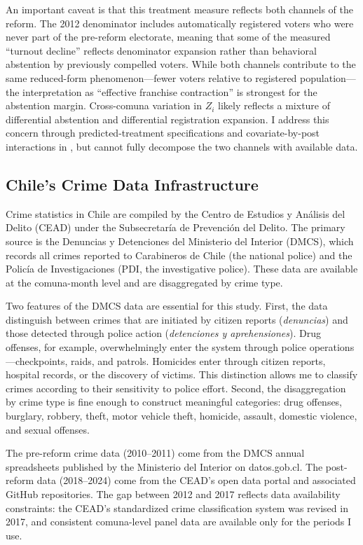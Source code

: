 \documentclass[12pt]{article}
\begin{document}
An important caveat is that this treatment measure reflects both channels of the reform. The 2012 denominator includes automatically registered voters who were never part of the pre-reform electorate, meaning that some of the measured ``turnout decline'' reflects denominator expansion rather than behavioral abstention by previously compelled voters. While both channels contribute to the same reduced-form phenomenon---fewer voters relative to registered population---the interpretation as ``effective franchise contraction'' is strongest for the abstention margin. Cross-comuna variation in $Z_i$ likely reflects a mixture of differential abstention and differential registration expansion. I address this concern through predicted-treatment specifications and covariate-by-post interactions in , but cannot fully decompose the two channels with available data.

\subsection{Chile's Crime Data Infrastructure}

Crime statistics in Chile are compiled by the Centro de Estudios y An\'{a}lisis del Delito (CEAD) under the Subsecretar\'{i}a de Prevenci\'{o}n del Delito. The primary source is the Denuncias y Detenciones del Ministerio del Interior (DMCS), which records all crimes reported to Carabineros de Chile (the national police) and the Polic\'{i}a de Investigaciones (PDI, the investigative police). These data are available at the comuna-month level and are disaggregated by crime type.

Two features of the DMCS data are essential for this study. First, the data distinguish between crimes that are initiated by citizen reports (\textit{denuncias}) and those detected through police action (\textit{detenciones y aprehensiones}). Drug offenses, for example, overwhelmingly enter the system through police operations---checkpoints, raids, and patrols. Homicides enter through citizen reports, hospital records, or the discovery of victims. This distinction allows me to classify crimes according to their sensitivity to police effort. Second, the disaggregation by crime type is fine enough to construct meaningful categories: drug offenses, burglary, robbery, theft, motor vehicle theft, homicide, assault, domestic violence, and sexual offenses.

The pre-reform crime data (2010--2011) come from the DMCS annual spreadsheets published by the Ministerio del Interior on datos.gob.cl. The post-reform data (2018--2024) come from the CEAD's open data portal and associated GitHub repositories. The gap between 2012 and 2017 reflects data availability constraints: the CEAD's standardized crime classification system was revised in 2017, and consistent comuna-level panel data are available only for the periods I use.
\end{document}

